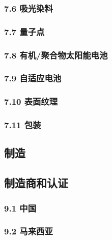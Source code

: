 \subsubsection{7.6 吸光染料}



\subsubsection{7.7 量子点}



\subsubsection{7.8 有机/聚合物太阳能电池}



\subsubsection{7.9 自适应电池}



\subsubsection{7.10 表面纹理}



\subsubsection{7.11 包装}



\subsection{制造}



\subsection{制造商和认证}



\subsubsection{9.1 中国}



\subsubsection{9.2 马来西亚}



